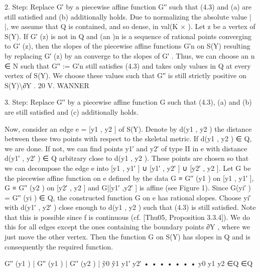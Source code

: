 \documentclass[
  10pt,
]{article}
\newenvironment{Shaded}{}{}
\newcommand{\NormalTok}[1]{#1}
\begin{document}
\begin{Shaded}
\begin{Highlighting}[]
\NormalTok{    2. Step: Replace G′ by a piecewise affine function G′′ such that (4.3) and (a)}
\NormalTok{             are still satisfied and (b) additionally holds.}
\NormalTok{   Due to normalizing the absolute value | |, we assume that Q is contained, and so dense,}
\NormalTok{in val(K × ). Let z be a vertex of S(Y). If G′ (z) is not in Q and (an )n is a sequence of}
\NormalTok{rational points converging to G′ (z), then the slopes of the piecewise affine functions G′n}
\NormalTok{on S(Y) resulting by replacing G′ (z) by an converge to the slopes of G′ . Thus, we can}
\NormalTok{choose an n ∈ N such that G′′ := G′n still satisfies (4.3) and takes only values in Q at}
\NormalTok{every vertex of S(Y). We choose these values such that G′′ is still strictly positive on}
\NormalTok{S(Y)\textbackslash{}∂Y .}
\NormalTok{20                                             V. WANNER}

\NormalTok{      3. Step: Replace G′′ by a piecewise affine function G such that (4.3), (a) and (b)}
\NormalTok{               are still satisfied and (c) additionally holds.}

\NormalTok{    Now, consider an edge e = [y1 , y2 ] of S(Y). Denote by d(y1 , y2 ) the distance between}
\NormalTok{these two points with respect to the skeletal metric. If d(y1 , y2 ) ∈ Q, we are done. If}
\NormalTok{not, we can find points y1′ and y2′ of type II in e with distance d(y1′ , y2′ ) ∈ Q arbitrary}
\NormalTok{close to d(y1 , y2 ). These points are chosen so that we can decompose the edge e into}
\NormalTok{[y1 , y1′ ] ∪ [y1′ , y2′ ] ∪ [y2′ , y2 ]. Let G be the piecewise affine function on e defined by the}
\NormalTok{data G ≡ G′′ (y1 ) on [y1 , y1′ ], G ≡ G′′ (y2 ) on [y2′ , y2 ] and G|[y1′ ,y2′ ] is affine (see Figure 1).}
\NormalTok{Since G(yi′ ) = G′′ (yi ) ∈ Q, the constructed function G on e has rational slopes. Choose}
\NormalTok{yi′ with d(y1′ , y2′ ) close enough to d(y1 , y2 ) such that (4.3) is still satisfied. Note that this}
\NormalTok{is possible since f is continuous (cf. [Thu05, Proposition 3.3.4]).}
\NormalTok{    We do this for all edges except the ones containing the boundary points ∂Y , where}
\NormalTok{we just move the other vertex. Then the function G on S(Y) has slopes in Q and is}
\NormalTok{consequently the required function.}


\NormalTok{                                                    G′′ (y1 )}
\NormalTok{                                                        |}
\NormalTok{              G′′ (y1 )}
\NormalTok{                  |}
\NormalTok{                                                                                         G′′ (y2 )}
\NormalTok{                                                                                             |}
\NormalTok{                          ỹ0                 ỹ1               y1′                y2′}
\NormalTok{                 •         •                   •       •        •                  •        •}
\NormalTok{                 y0                                    y1                                   y2}
\NormalTok{                                  ∈Q                                   ∈Q}


\end{Highlighting}
\end{Shaded}
\end{document}
